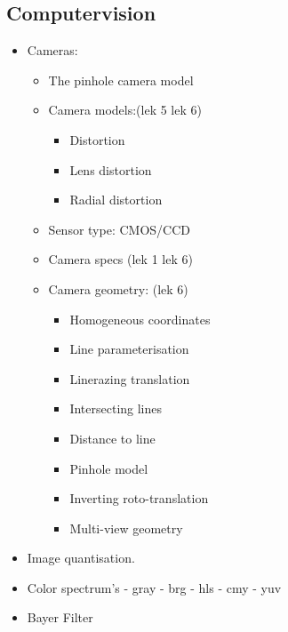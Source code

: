 \documentclass[a4paper,11pt]{article}
\begin{document}
\subsection{Computervision} %
\begin{itemize}
    \item Cameras:
        \begin{itemize}
            \item The pinhole camera model
            \item Camera models:(lek 5 lek 6)
                \begin{itemize}
                    \item Distortion                     
                    \item Lens distortion
                    \item Radial distortion 
                \end{itemize}
            \item Sensor type: CMOS/CCD
            \item Camera specs (lek 1 lek 6)
            \item Camera geometry: (lek 6)
                \begin{itemize}
                    \item Homogeneous coordinates
                    \item Line parameterisation 
                    \item Linerazing translation
                    \item Intersecting lines 
                    \item Distance to line
                    \item Pinhole model
                    \item Inverting roto-translation
                    \item Multi-view geometry 
                \end{itemize}
        \end{itemize}
    \item Image quantisation.
    \item Color spectrum's - gray - brg - hls - cmy - yuv
    \item Bayer Filter


\end{itemize}
\end{document}
